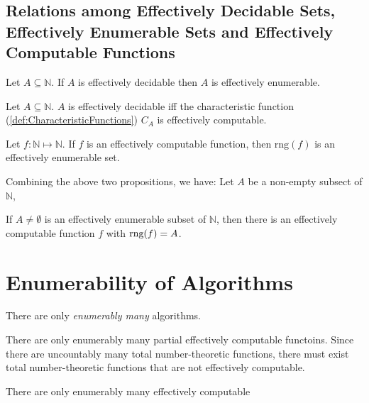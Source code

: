\subsection{Relations among Effectively Decidable Sets, Effectively Enumerable Sets and Effectively Computable Functions}

\begin{proposition}
    Let $A \subseteq \mathbb{N}$. If $A$ is effectively decidable then $A$ is effectively enumerable.
\end{proposition}

\begin{proposition}
    Let $A \subseteq \mathbb{N}$. $A$ is effectively decidable iff the characteristic function (\ref{def:CharacteristicFunctions}) $C_A$ is effectively computable.
\end{proposition}

\begin{proposition}
    Let $f:\mathbb{N}\mapsto\mathbb{N}$. If $f$ is an effectively computable function, then $\textrm{rng}(f)$ is an effectively enumerable set.
\end{proposition}

\begin{proposition}
    Combining the above two propositions, we have: Let $A$ be a non-empty subsect of $\mathbb{N}$,
\end{proposition}

\begin{proposition}
    If $A\neq\emptyset$ is an effectively enumerable subset of $\mathbb{N}$, then there is an effectively computable function $f$ with $\textrm{rng}(f)=A$.
\end{proposition}

\section{Enumerability of Algorithms}
\label{sec:EnumerabilityOfAlgos}

\begin{theorem}
    There are only \emph{enumerably many} algorithms.
\end{theorem}
\begin{corollary}
    There are only enumerably many partial effectively computable functoins. Since there are uncountably many total number-theoretic functions, there must exist total number-theoretic functions that are not effectively computable.
\end{corollary}
\begin{corollary}
    There are only enumerably many effectively computable
\end{corollary}

